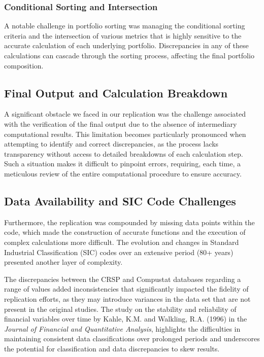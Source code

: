 \documentclass{article}
\begin{document}
\subsubsection*{Conditional Sorting and Intersection}

A notable challenge in portfolio sorting was managing the conditional sorting criteria and the intersection of various metrics that is highly sensitive to the accurate calculation of each underlying portfolio. Discrepancies in any of these calculations can cascade through the sorting process, affecting the final portfolio composition.

\subsection*{Final Output and Calculation Breakdown}

A significant obstacle we faced in our replication was the challenge associated with the verification of the final output due to the absence of intermediary computational results. This limitation becomes particularly pronounced when attempting to identify and correct discrepancies, as the process lacks transparency without access to detailed breakdowns of each calculation step. Such a situation makes it difficult to pinpoint errors, requiring, each time, a meticulous review of the entire computational procedure to ensure accuracy.

\subsection*{Data Availability and SIC Code Challenges}

Furthermore, the replication was compounded by missing data points within the code, which made the construction of accurate functions and the execution of complex calculations more difficult. The evolution and changes in Standard Industrial Classification (SIC) codes over an extensive period (80+ years) presented another layer of complexity. 

The discrepancies between the CRSP and Compustat databases regarding a range of values added inconsistencies that significantly impacted the fidelity of replication efforts, as they may introduce variances in the data set that are not present in the original studies. The study on the stability and reliability of financial variables over time by Kahle, K.M. and Walkling, R.A. (1996) in the \textit{Journal of Financial and Quantitative Analysis}, highlights the difficulties in maintaining consistent data classifications over prolonged periods and underscores the potential for classification and data discrepancies to skew results.
\end{document}
